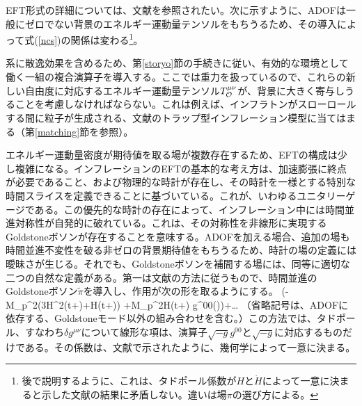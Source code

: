 EFT形式の詳細については、文献\cite{Creminelli:2006xe, eft1, multieft}を参照されたい。次に示すように、ADOFは一般にゼロでない背景のエネルギー運動量テンソルをもちうるため、その導入によって式(\ref{ncs})の関係は変わる\footnote{後で説明するように、これは、タドポール係数が$H$と$\dot H$によって一意に決まると示した文献\cite{eft1}の結果に矛盾しない。違いは場$\pi$の選び方による。}。



\label{newdof}

系に散逸効果を含めるため、第\ref{storyo}節の手続きに従い、有効的な環境として働く一組の複合演算子を導入する。ここでは重力を扱っているので、これらの新しい自由度に対応するエネルギー運動量テンソル$T^{\mu\nu}_{\cal O}$が、背景に大きく寄与しうることを考慮しなければならない。これは例えば、インフラトンがスローロールする間に粒子が生成される、文献\cite{trapped}のトラップ型インフレーション模型に当てはまる（第\ref{matching}節を参照）。

エネルギー運動量密度が期待値を取る場が複数存在するため、EFTの構成は少し複雑になる。インフレーションのEFTの基本的な考え方は、加速膨張に終点が必要であること、および物理的な時計が存在し、その時計を一様とする特別な時間スライスを定義できることに基づいている。これが、いわゆるユニタリーゲージである。この優先的な時計の存在によって、インフレーション中には時間並進対称性が自発的に破れている。これは、その対称性を非線形に実現するGoldstoneボソンが存在することを意味する。ADOFを加える場合、追加の場も時間並進不変性を破る非ゼロの背景期待値をもちうるため、時計の場の定義には曖昧さが生じる。それでも、Goldstoneボソンを補間する場には、同等に適切な二つの自然な定義がある。第一は文献\cite{multieft}の方法に従うもので、時間並進のGoldstoneボソン$\tilde\pi$を導入し、作用が次の形を取るようにする\cite{eft1,multieft}。
\beq
\label{orunit}
\int {} \left(-M_p^2(3H^2(t+\tilde\pi)+\dot H(t+\tilde\pi)) +M_p^2\dot H(t+\tilde\pi) \tilde g^{00}(\tilde\pi)\right)+\ldots \eeq 
（省略記号は、ADOFに依存する、Goldstoneモード以外の組み合わせを含む。）この方法では、タドポール、すなわち$\delta g^{\mu\nu}$について線形な項は、演算子$\sqrt{-g}g^{00}$と$\sqrt{-g}$に対応するものだけである。その係数は、文献\cite{eft1,multieft}で示されたように、幾何学によって一意に決まる。

